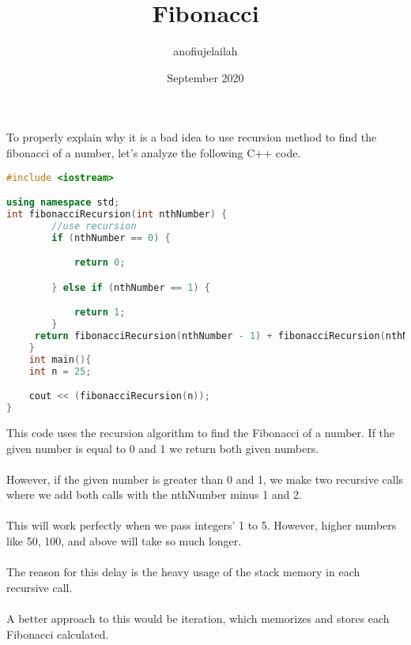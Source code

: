 \documentclass{article}
\title{Fibonacci}
\author{anofiujelailah }
\date{September 2020}
\begin{document}
\maketitle
To properly explain why it is a bad idea to use recursion method to find the fibonacci of a number, let's analyze the following C++ code.
\begin{lstlisting}[language=C++, caption=Recursion example]
#include <iostream>

using namespace std;
int fibonacciRecursion(int nthNumber) {
        //use recursion
        if (nthNumber == 0) {

            return 0;

        } else if (nthNumber == 1) {

            return 1;
        }   
     return fibonacciRecursion(nthNumber - 1) + fibonacciRecursion(nthNumber - 2);
    }
    int main(){
    int n = 25; 

    cout << (fibonacciRecursion(n));
}
\end{lstlisting}
This code uses the recursion algorithm to find the Fibonacci of a number. If the given number is equal to 0 and 1 we return both given numbers.\\\\
However, if the given number is greater than 0 and 1, we make two recursive calls where we add both calls with the nthNumber minus 1 and 2.\\\\
This will work perfectly when we pass integers' 1 to 5. However, higher numbers like 50, 100, and above will take so much longer. \\\\
The reason for this delay is the heavy usage of the stack memory in each recursive call.\\\\
A better approach to this would be iteration, which memorizes and stores each Fibonacci calculated.
\end{document}
